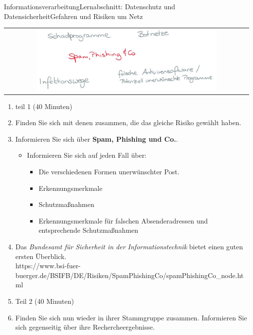 \documentclass[oneside,openany,headings=optiontotoc,11pt,numbers=noenddot]{scrreprt}
\begin{document}
\begin{worksheet}{Informationsverarbeitung}{Lernabschnitt: Datenschutz und Datensicherheit}{Gefahren und Risiken um Netz}
		\newpage
		\setcounter{page}{1}
		\begin{framed}
			\begin{tabular}{lcr}
				& \includegraphics[width=0.8\textwidth]{../99_Bilder/SpamPhishing.jpg} & \\
			\end{tabular}
		\end{framed}
		\begin{enumerate}[label=(\Roman*.)]
			\item[] \color{gray}teil 1 (40 Minuten)\normalcolor
			\item Finden Sie sich mit denen zusammen, die das gleiche Risiko gewählt haben.
			\item Informieren Sie sich über \textbf{Spam, Phishing und Co.}.
			\begin{itemize}
				\item[] Informieren Sie sich auf jeden Fall über:
				\begin{itemize}
					\item Die verschiedenen Formen unerwünschter Post.
					\item Erkennungsmerkmale
					\item Schutzmaßnahmen
					\item Erkennungsmerkmale für falschen Absenderadressen und entsprechende Schutzmaßnahmen
				\end{itemize}
			\end{itemize}
			\item[] Das \textit{Bundesamt für Sicherheit in der Informationstechnik} bietet einen guten ersten Überblick.\\
			\small{\color{codegray}https://www.bsi-fuer-buerger.de/BSIFB/DE/Risiken/SpamPhishingCo/spamPhishingCo\_node.html}\normalsize
			\item[] \color{gray}Teil 2 (40 Minuten)\normalcolor
			\item Finden Sie sich nun wieder in ihrer Stammgruppe zusammen. Informieren Sie sich gegenseitig über ihre Rechercheergebnisse.
		\end{enumerate}


\end{worksheet}
\end{document}
